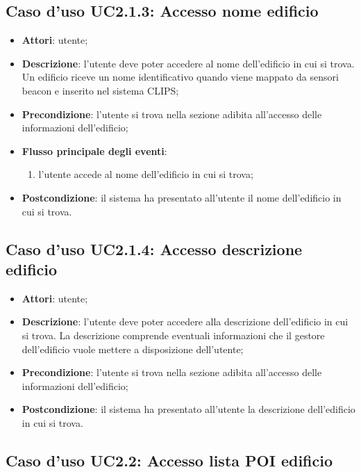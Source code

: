 \documentclass[../AnalisiDeiRequisiti.tex]{subfiles}
\begin{document}
\subsection{Caso d'uso UC2.1.3: Accesso nome edificio}

\begin{itemize}
\item \textbf{Attori}: utente;
\item \textbf{Descrizione}: l'utente deve poter accedere al nome dell'edificio in cui si trova. Un edificio riceve un nome identificativo quando viene mappato da sensori beacon e inserito nel sistema CLIPS; 
      \item \textbf{Precondizione}: l'utente si trova nella sezione adibita all'accesso delle informazioni dell'edificio;

        \item \textbf{Flusso principale degli eventi}:
          \begin{enumerate}
          \item l'utente accede al nome dell'edificio in cui si trova;

      \end{enumerate}
    \item \textbf{Postcondizione}: il sistema ha presentato all'utente il nome dell'edificio in cui si trova.
  \end{itemize}
\hypertarget{UC2.1.4}{}
\subsection{Caso d'uso UC2.1.4: Accesso descrizione edificio}
\begin{itemize}
\item \textbf{Attori}: utente;
\item \textbf{Descrizione}: l'utente deve poter accedere alla descrizione dell'edificio in cui si trova. La descrizione comprende eventuali informazioni che il gestore dell'edificio vuole mettere a disposizione dell'utente; 
      \item \textbf{Precondizione}: l'utente si trova nella sezione adibita all'accesso delle informazioni dell'edificio;
    \item \textbf{Postcondizione}: il sistema ha presentato all'utente la descrizione dell'edificio in cui si trova.
  \end{itemize}
\hypertarget{UC2.2}{}
\subsection{Caso d'uso UC2.2: Accesso lista POI edificio}
\end{document}
